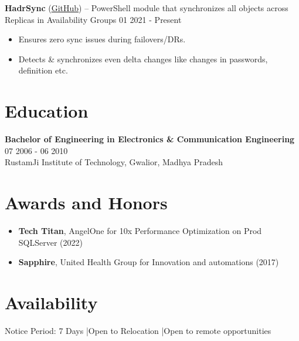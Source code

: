 \documentclass[10pt,a4paper]{article}
\begin{document}
\textbf{HadrSync} (\href{https://github.com/imajaydwivedi/HadrSync}{GitHub}) -- PowerShell module that synchronizes all objects across Replicas in Availability Groups \hfill 01 2021 - Present
\begin{itemize}
\item Ensures zero sync issues during failovers/DRs.
\item Detects \& synchronizes even delta changes like changes in passwords, definition etc.
\end{itemize}

\section{Education}
\textbf{Bachelor of Engineering in Electronics \& Communication Engineering} \hfill 07 2006 - 06 2010\\
RustamJi Institute of Technology, Gwalior, Madhya Pradesh

\section{Awards and Honors}
\begin{itemize}
\item \textbf{Tech Titan}, AngelOne for 10x Performance Optimization on Prod SQLServer (2022)
\item \textbf{Sapphire}, United Health Group for Innovation and automations (2017)
\end{itemize}

\section{Availability}
Notice Period: 7 Days \quad|\quad Open to Relocation \quad|\quad Open to remote opportunities
\end{document}
